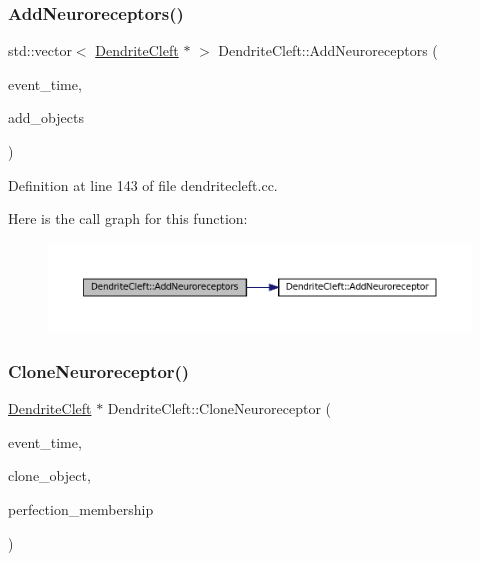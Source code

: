 \subsubsection{\texorpdfstring{Add\+Neuroreceptors()}{AddNeuroreceptors()}}
{\footnotesize\ttfamily std\+::vector$<$ \mbox{\hyperlink{class_dendrite_cleft}{Dendrite\+Cleft}} $\ast$ $>$ Dendrite\+Cleft\+::\+Add\+Neuroreceptors (\begin{DoxyParamCaption}\item[{std\+::chrono\+::time\+\_\+point$<$ \mbox{\hyperlink{universe_8h_a0ef8d951d1ca5ab3cfaf7ab4c7a6fd80}{Clock}} $>$}]{event\+\_\+time,  }\item[{std\+::vector$<$ \mbox{\hyperlink{class_dendrite_cleft}{Dendrite\+Cleft}} $\ast$$>$}]{add\+\_\+objects }\end{DoxyParamCaption})}



Definition at line 143 of file dendritecleft.\+cc.

Here is the call graph for this function\+:\nopagebreak
\begin{figure}[H]
\begin{center}
\leavevmode
\includegraphics[width=350pt]{class_dendrite_cleft_a6d29f577ff12366f8f51804b13468395_cgraph}
\end{center}
\end{figure}
\mbox{\label{class_dendrite_cleft_a7650e1115baab30729da0b03a48da851}} 
\subsubsection{\texorpdfstring{Clone\+Neuroreceptor()}{CloneNeuroreceptor()}}
{\footnotesize\ttfamily \mbox{\hyperlink{class_dendrite_cleft}{Dendrite\+Cleft}} $\ast$ Dendrite\+Cleft\+::\+Clone\+Neuroreceptor (\begin{DoxyParamCaption}\item[{std\+::chrono\+::time\+\_\+point$<$ \mbox{\hyperlink{universe_8h_a0ef8d951d1ca5ab3cfaf7ab4c7a6fd80}{Clock}} $>$}]{event\+\_\+time,  }\item[{\mbox{\hyperlink{class_dendrite_cleft}{Dendrite\+Cleft}} $\ast$}]{clone\+\_\+object,  }\item[{double}]{perfection\+\_\+membership }\end{DoxyParamCaption})}



